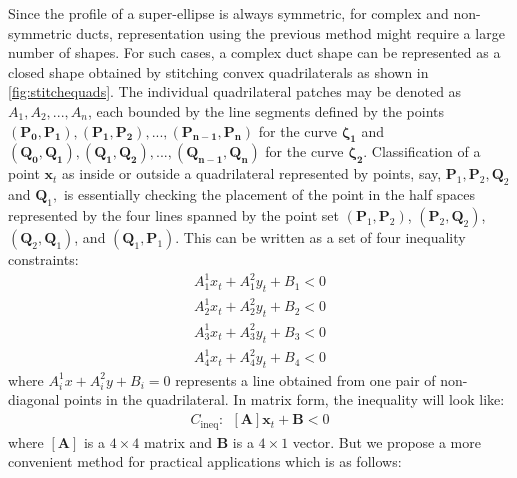 \documentclass[12pt,a4]{article}
\begin{document}
Since the profile of a super-ellipse is always symmetric, for complex and non-symmetric ducts, representation using the previous method might require a large number of shapes. For such cases, a complex duct shape can be represented as a closed shape obtained by stitching convex quadrilaterals as shown in \ref{fig:stitchequads}. The individual quadrilateral patches may be denoted as $A_1,A_2,...,A_n$, each bounded by the line segments defined by the points $\mathbf{(P_0,P_1),(P_1,P_2),...,(P_{n-1},P_n)}$ for the curve $\mathbf{\zeta_1}$ and $\mathbf{(Q_0,Q_1),(Q_1,Q_2),...,(Q_{n-1},Q_n)}$ for the curve $\mathbf{\zeta_2}$. Classification of a point $\mathbf{x}_t$ as inside or outside a quadrilateral represented by points, say, $\mathbf{P}_1,\mathbf{P}_2,\mathbf{Q}_2$ and $\mathbf{Q}_1,$ is essentially checking the placement of the point in the half spaces represented by the four lines spanned by the point set $\left(\mathbf{P}_1,\mathbf{P}_2\right)$, $\left(\mathbf{P}_2,\mathbf{Q}_2\right)$, $\left(\mathbf{Q}_2,\mathbf{Q}_1\right)$, and $\left(\mathbf{Q}_1,\mathbf{P}_1\right)$. This can be written as a set of four inequality constraints:
\begin{align}
A^1_1 x_t+ A^2_1 y_t +B_1 <0\\
\nonumber A^1_2 x_t+ A^2_2 y_t +B_2 <0\\
\nonumber A^1_3 x_t+ A^2_3 y_t +B_3 <0\\
\nonumber A^1_4 x_t+ A^2_4 y_t +B_4 <0
\end{align}
where $A_i^1 x+A_i^2y+B_i=0$ represents a line obtained from one pair of non-diagonal points in the quadrilateral. In matrix form, the inequality will look like:
\begin{align}
C_\text{ineq}:~~ \left[\mathbf{A} \right] \mathbf{x}_t +\mathbf{B} <0
\end{align}
where $\left[\mathbf{A} \right]$ is a $4\times 4$ matrix and $\mathbf{B}$ is a $4 \times 1$ vector.
But we propose a more convenient method for practical applications which is as follows:
\end{document}
